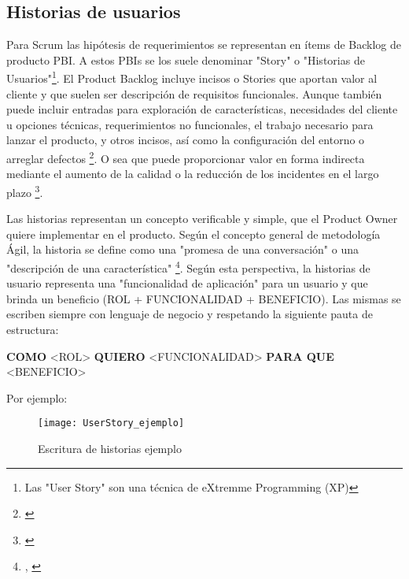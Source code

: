 \subsection{Historias de usuarios}

Para Scrum las hipótesis de requerimientos se representan en ítems de Backlog de producto PBI. A estos PBIs se los suele denominar "Story" o "Historias de Usuarios"\footnote{Las "User Story" son una técnica de eXtremme Programming (XP)}. El Product Backlog incluye incisos o Stories que aportan valor al cliente y que suelen ser descripción de requisitos funcionales. Aunque también puede incluir entradas para exploración de características, necesidades del cliente u opciones técnicas, requerimientos no funcionales, el trabajo necesario para lanzar el producto, y otros incisos, así como la configuración del entorno o arreglar defectos \footnote{\cite{Scrum-Institute-2015}}. O sea que puede proporcionar valor en forma indirecta mediante el aumento de la calidad o la reducción de los incidentes en el largo plazo \footnote{\cite{Scrum-Institute-2015}}.

Las historias representan un concepto verificable y simple, que el Product Owner quiere implementar en el producto. Según el concepto general de metodología Ágil, la historia se define como una "promesa de una conversación" o una "descripción de una característica" \footnote{\cite{UNTREF-2014}, \cite{Dan-North-2015}}. Según esta perspectiva, la historias de usuario representa una "funcionalidad de aplicación" para un usuario y que brinda un beneficio (ROL + FUNCIONALIDAD + BENEFICIO). Las mismas se escriben siempre con lenguaje de negocio y respetando la siguiente pauta de estructura:\newline

\textbf{COMO} <ROL> \textbf{QUIERO} <FUNCIONALIDAD> \textbf{PARA QUE} <BENEFICIO>\newline

Por ejemplo:
\begin{figure}[h]
  \centering
  \texttt{[image: UserStory\_ejemplo]}
  \caption{Escritura de historias ejemplo}
  \centering
  \label{fig:StoryHierarchy} %
\end{figure}
\FloatBarrier %

